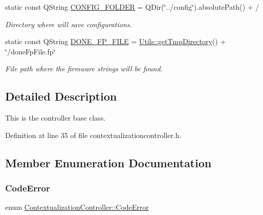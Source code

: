 \begin{DoxyCompactItemize}
\mbox{\label{classContextualizationController_ad01707b9671cf54a78960d7fdfa25463}} 
static const Q\+String \mbox{\hyperlink{classContextualizationController_ad01707b9671cf54a78960d7fdfa25463}{C\+O\+N\+F\+I\+G\+\_\+\+F\+O\+L\+D\+ER}} = Q\+Dir(\char`\"{}../config\char`\"{}).absolute\+Path() + \textquotesingle{}/\textquotesingle{}
\begin{DoxyCompactList}\small\item\em Directory where will save configurations. \end{DoxyCompactList}\item 
\mbox{\label{classContextualizationController_a3d9769435b8558c75379938e3e78ca95}} 
static const Q\+String \mbox{\hyperlink{classContextualizationController_a3d9769435b8558c75379938e3e78ca95}{D\+O\+N\+E\+\_\+\+F\+P\+\_\+\+F\+I\+LE}} = \mbox{\hyperlink{classUtils_a85a0cb065fa4399c42ce834952420d7a}{Utils\+::get\+Tmp\+Directory}}() + \char`\"{}/done\+Fp\+File.\+fp\char`\"{}
\begin{DoxyCompactList}\small\item\em File path where the firmware strings will be found. \end{DoxyCompactList}\end{DoxyCompactItemize}


\subsection{Detailed Description}
This is the controller base class. 

Definition at line 35 of file contextualizationcontroller.\+h.



\subsection{Member Enumeration Documentation}
\mbox{\label{classContextualizationController_acb38587f7f9e610a5950956b345d69fd}} 
\subsubsection{\texorpdfstring{Code\+Error}{CodeError}}
{\footnotesize\ttfamily enum \mbox{\hyperlink{classContextualizationController_acb38587f7f9e610a5950956b345d69fd}{Contextualization\+Controller\+::\+Code\+Error}}}




